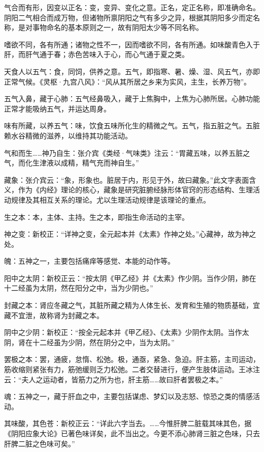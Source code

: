 \documentclass[12pt]{ctexbook}
\begin{document}
\begin{jiaozhu}
  \item 气合而有形，因变以正名：变，变异、变化之意。正名，定正名称，即准确命名。阴阳二气相合而成万物，但诸物所禀阴阳之气有多少之异，根据其阴阳多少而定名称，是对事物命名的基本原则之一，故有阴阳太少等不同名称。
  \item 嗜欲不同，各有所通；诸物之性不一，因而嗜欲不同，各有所通。如味酸青色入于肝，而肝气通于春；赤色苦味入于心，而心气通于夏之类。
  \item 天食人以五气：食，同饲，供养之意。五气，即指寒、暑、燥、湿、风五气，亦即正常气候。《灵枢·九宫八风》：“风从其所居之乡来为实风，主生，长养万物”。
  \item 五气入鼻，藏于心肺：五气经鼻吸入，藏于上焦胸中，上焦为心肺所居。心肺功能正常才能吸纳五气，并运达周身。
  \item 味有所藏，以养五气：味，饮食五味所化生的精微之气。五气，指五脏之气。五脏赖水谷精微的滋养，以维持其功能活动。
  \item 气和而生……神乃自生：张介宾《类经·气味类》注云：“胃藏五味，以养五脏之气，而化生津液以成精，精气充而神自生。”
  \item 藏象：张介宾云：“象，形象也。脏居于内，形见于外，故曰藏象。”此文字表面含义，作为《内经》理论的核心，藏象是研究脏腑经脉形体官窍的形态结构、生理活动规律及其相互关系的理论。尤以生理活动规律是该理论的重点。
  \item 生之本：本，主体、主持。生之本，即指生命活动的主宰。
  \item 神之变：新校正：“详神之变，全元起本并《太素》作神之处。”心藏神，故为神之处。
  \item 魄：五神之一，主要包括痛痒等感觉、本能的动作等。
  \item 阳中之太阴：新校正云：“按太阴《甲乙经》并《太素》作少阴。当作少阴，肺在十二经虽为太阴，然在阳分之中，当为少阴也。”
  \item 封藏之本：肾应冬藏之气，其脏所藏之精为人体生长、发育和生殖的物质基础，宜藏不宜泄，故称肾为封藏之本。
  \item 阴中之少阴：新校正：“按全元起本并《甲乙经》、《太素》少阴作太阴。当作太阴，肾在十二经虽为少阴，然在阴分之中，当为太阴。”
  \item 罢极之本：罢，通疲，怠惰、松弛。极，通亟，紧急、急迫。肝主筋，主司运动，筋收缩则紧张有力，筋弛缓则乏力松弛。二者交替进行，便产生肢体运动。王冰注云：“夫人之运动者，皆筋力之所为也，肝主筋……故曰肝者罢极之本。”
  \item 魂：五神之一，藏于肝血之中，主要包括谋虑、梦幻以及志怒、惊恐之类的情感活动。
  \item 其味酸，其色苍：新校正云：“详此六字当去。……今惟肝脾二脏载其味其色，据《阴阳应象大论》已著色味详矣，此不当出之。今更不添心肺肾三脏之色味，只去肝脾二脏之色味可矣。”

\end{jiaozhu}
\end{document}
